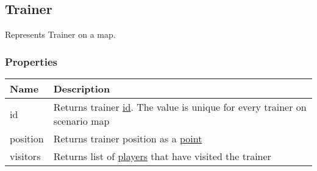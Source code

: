 \subsection{Trainer}
\label{Trainer}
Represents Trainer on a map.
\subsubsection{Properties}
\begin{center}
\begin{tabularx}{\linewidth}{| l | X |}
\hline
\textbf{Name} & \textbf{Description} \\
\hline
id & Returns trainer \hyperref[Id]{id}. The value is unique for every trainer on scenario map\\
\hline
position & Returns trainer position as a \hyperref[Point]{point}\\
\hline
visitors & Returns list of \hyperref[Player]{players} that have visited the trainer\\
\hline
\end{tabularx}
\end{center}
